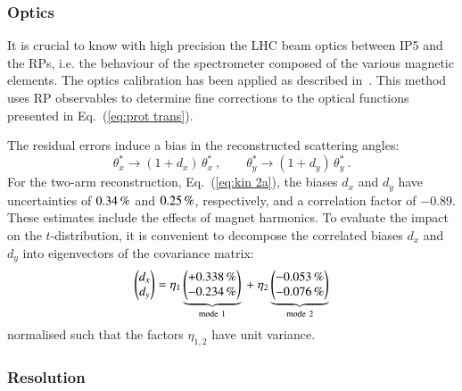 
\subsubsection{Optics}
\label{sec:optics}
It is crucial to know with high precision the LHC beam optics between IP5 and the RPs, i.e. the behaviour of the spectrometer composed of the various magnetic elements.
The optics calibration has been applied as described in~\cite{totem-optics}. This method uses RP observables to determine fine corrections to the optical functions presented in Eq.~(\ref{eq:prot trans}).

The residual errors induce a bias in the reconstructed scattering angles:
\begin{equation}
\label{eq:opt bias}
	\theta_x^* \rightarrow (1 + d_x)\, \theta_x^*\ ,\qquad
	\theta_y^* \rightarrow (1 + d_y)\, \theta_y^*\ .
\end{equation}
For the two-arm reconstruction, Eq.~(\ref{eq:kin 2a}), the biases $d_x$ and $d_y$ have uncertainties of $0.34\,{\rm \%}$ and $0.25\,{\rm \%}$, respectively, and a correlation factor of $-0.89$. These estimates include the effects of magnet harmonics. To evaluate the impact on the $t$-distribution, it is convenient to decompose the correlated biases $d_x$ and $d_y$ into eigenvectors of the covariance matrix:
\begin{equation}
\label{eq:opt bias modes}
\begin{pmatrix} d_x\cr d_y \end{pmatrix} =
	\eta_1 \underbrace{\begin{pmatrix} +0.338\,{\rm \%} \cr -0.234\,{\rm \%} \end{pmatrix}}_{\rm mode\ 1}
	\ +\ \eta_2 \underbrace{\begin{pmatrix} -0.053\,{\rm \%} \cr -0.076\,{\rm \%} \end{pmatrix}}_{\rm mode\ 2}
\end{equation}
normalised such that the factors $\eta_{1,2}$ have unit variance.



\subsubsection{Resolution}
\label{sec:resolution}

